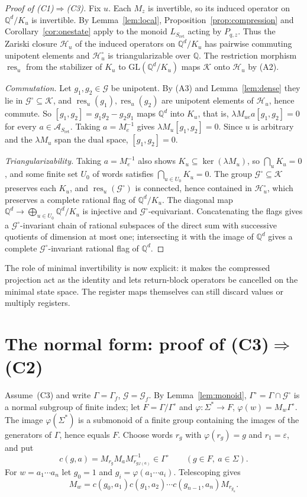 \documentclass[11pt,letterpaper]{article}
\newcommand{\Q}{\mathbb{Q}}
\newcommand{\cG}{\mathcal{G}}
\newcommand{\cK}{\mathcal{K}}
\newcommand{\cH}{\mathcal{H}}
\newcommand{\cA}{\mathcal{A}}
\newcommand{\GL}{\mathrm{GL}}
\newcommand{\eps}{\varepsilon}
\newcommand{\res}{\operatorname{res}}
\theoremstyle{definition}
\begin{document}
\begin{proof}[Proof of (C1)$\Rightarrow$(C3)]
Fix $u$. Each $M_z$ is invertible, so its induced operator on $\Q^d/K_u$ is invertible. By Lemma~\ref{lem:local}, Proposition~\ref{prop:compression} and Corollary~\ref{cor:onestate} apply to the monoid $L_{S_{\mathrm{ret}}}$ acting by $P_{q,z}$. Thus the Zariski closure $\cH_u$ of the induced operators on $\Q^d/K_u$ has pairwise commuting unipotent elements and $\cH_u^\circ$ is triangularizable over $\Q$. The restriction morphism $\res_u$ from the stabilizer of $K_u$ to $\GL(\Q^d/K_u)$ maps $\cK$ onto $\cH_u$ by (A2).

\emph{Commutation.} Let $g_1,g_2\in\cG$ be unipotent. By (A3) and Lemma~\ref{lem:dense} they lie in $\cG^\circ\subseteq\cK$, and $\res_u(g_1),\res_u(g_2)$ are unipotent elements of $\cH_u$, hence commute. So $[g_1,g_2]=g_1g_2-g_2g_1$ maps $\Q^d$ into $K_u$, that is, $\lambda M_{ue}a[g_1,g_2]=0$ for every $a\in\cA_{S_{\mathrm{ret}}}$. Taking $a=M_e^{-1}$ gives $\lambda M_u[g_1,g_2]=0$. Since $u$ is arbitrary and the $\lambda M_u$ span the dual space, $[g_1,g_2]=0$.

\emph{Triangularizability.} Taking $a=M_e^{-1}$ also shows $K_u\subseteq\ker(\lambda M_u)$, so $\bigcap_uK_u=0$, and some finite set $U_0$ of words satisfies $\bigcap_{u\in U_0}K_u=0$. The group $\cG^\circ\subseteq\cK$ preserves each $K_u$, and $\res_u(\cG^\circ)$ is connected, hence contained in $\cH_u^\circ$, which preserves a complete rational flag of $\Q^d/K_u$. The diagonal map $\Q^d\to\bigoplus_{u\in U_0}\Q^d/K_u$ is injective and $\cG^\circ$-equivariant. Concatenating the flags gives a $\cG^\circ$-invariant chain of rational subspaces of the direct sum with successive quotients of dimension at most one; intersecting it with the image of $\Q^d$ gives a complete $\cG^\circ$-invariant rational flag of $\Q^d$.
\end{proof}

The role of minimal invertibility is now explicit: it makes the compressed projection act as the identity and lets return-block operators be cancelled on the minimal state space. The register maps themselves can still discard values or multiply registers.

\section{The normal form: proof of (C3)\texorpdfstring{$\Rightarrow$}{=>}(C2)}\label{sec:normalform}
Assume~(C3) and write $\Gamma=\Gamma_f$, $\cG=\cG_f$. By Lemma~\ref{lem:monoid}, $\Gamma^\circ=\Gamma\cap\cG^\circ$ is a normal subgroup of finite index; let $F=\Gamma/\Gamma^\circ$ and $\varphi:\Sigma^*\to F$, $\varphi(w)=M_w\Gamma^\circ$. The image $\varphi(\Sigma^*)$ is a submonoid of a finite group containing the images of the generators of $\Gamma$, hence equals $F$. Choose words $r_g$ with $\varphi(r_g)=g$ and $r_1=\eps$, and put
\[
c(g,a)=M_{r_g}M_aM_{r_{g\varphi(a)}}^{-1}\in\Gamma^\circ\qquad(g\in F,\ a\in\Sigma).
\]
For $w=a_1\cdots a_n$ let $g_0=1$ and $g_i=\varphi(a_1\cdots a_i)$. Telescoping gives
\begin{equation}\label{eq:cocycle}
M_w=c(g_0,a_1)c(g_1,a_2)\cdots c(g_{n-1},a_n)M_{r_{g_n}}.
\end{equation}
\end{document}
